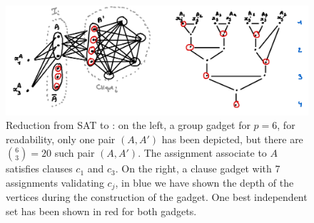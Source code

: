 \begin{figure}
    \includegraphics[width=\textwidth]{figures/indset-td-gadgets.png}
    \caption{Reduction from SAT to : on the left, a group gadget for $p = 6$, for readability, only one pair $(A, A')$ has been depicted, but there are $\binom{6}{3} = 20$ such pair $(A, A')$. The assignment associate to $A$ satisfies clauses $c_1$ and $c_3$. On the right, a clause gadget with 7 assignments validating $c_j$, in blue we have shown the depth of the vertices during the construction of the gadget. One best independent set has been shown in red for both gadgets.}
    \label{fig:indset-td-gadgets}
\end{figure}